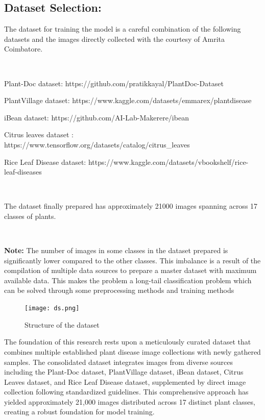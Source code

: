\subsection{Dataset Selection:}

The dataset for training the model is a careful combination of the following datasets and the images directly collected with the courtesy of Amrita Coimbatore.

\

Plant-Doc dataset: https://github.com/pratikkayal/PlantDoc-Dataset 

PlantVillage dataset: https://www.kaggle.com/datasets/emmarex/plantdisease

iBean dataset: https://github.com/AI-Lab-Makerere/ibean

Citrus leaves dataset : https://www.tensorflow.org/datasets/catalog/citrus\_leaves

Rice Leaf Disease dataset: https://www.kaggle.com/datasets/vbookshelf/rice-leaf-diseases

\

The dataset finally prepared has approximately 21000 images spanning across 17 classes of plants.

\

 \textbf{Note:} The number of images in some classes in the dataset prepared is significantly lower compared to the other classes. This imbalance is a result of the compilation of multiple data sources to prepare a master dataset with maximum available data. This makes the problem a long-tail classification problem which can be solved through some preprocessing methods and training methods


 \begin{figure}[h!]
    \centering
    \texttt{[image: ds.png]}
    \caption{Structure of the dataset}
    \label{fig:dataset_structure}
\end{figure}



The foundation of this research rests upon a meticulously curated dataset that combines multiple established plant disease image collections with newly gathered samples. The consolidated dataset integrates images from diverse sources including the Plant-Doc dataset, PlantVillage dataset, iBean dataset, Citrus Leaves dataset, and Rice Leaf Disease dataset, supplemented by direct image collection following standardized guidelines. This comprehensive approach has yielded approximately 21,000 images distributed across 17 distinct plant classes, creating a robust foundation for model training.

